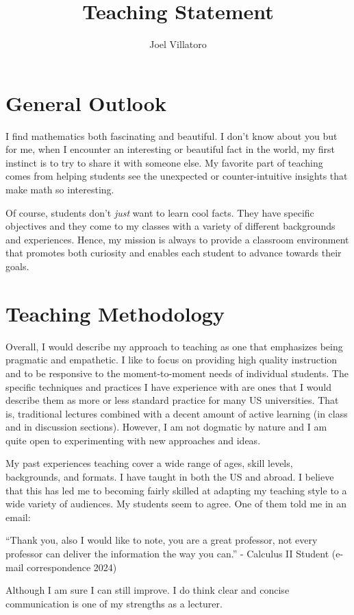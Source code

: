 \documentclass{article}
\title{Teaching Statement}
\author{Joel Villatoro}
\date{}
\begin{document}
\vspace{-0.5in}
\maketitle

\section*{General Outlook} I find mathematics both fascinating and beautiful. I don't know about you but for me, when I encounter an interesting or beautiful fact in the world, my first instinct is to try to share it with someone else. My favorite part of teaching comes from helping students see the unexpected or counter-intuitive insights that make math so interesting.

Of course, students don't \emph{just} want to learn cool facts. They have specific objectives and they come to my classes with a variety of different backgrounds and experiences. Hence, my mission is always to provide a classroom environment that promotes both curiosity and enables each student to advance towards their goals.

\section*{Teaching Methodology}

Overall, I would describe my approach to teaching as one that emphasizes being pragmatic and empathetic. I like to focus on providing high quality instruction and to be responsive to the moment-to-moment needs of individual students. The specific techniques and practices I have experience with are ones that I would describe them as more or less standard practice for many US universities. That is, traditional lectures combined with a decent amount of active learning (in class and in discussion sections). However, I am not dogmatic by nature and I am quite open to experimenting with new approaches and ideas.

My past experiences teaching cover a wide range of ages, skill levels, backgrounds, and formats. I have taught in both the US and abroad. I believe that this has led me to becoming fairly skilled at adapting my teaching style to a wide variety of audiences. My students seem to agree. One of them told me in an email:
\begin{mdframed}
``Thank you, also I would like to note, you are a great professor, not every professor can deliver the information the way you can.'' - Calculus II Student (e-mail correspondence 2024)
\end{mdframed}
Although I am sure I can still improve. I do think clear and concise communication is one of my strengths as a lecturer.
\end{document}
